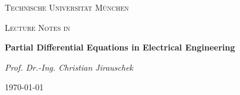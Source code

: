 \documentclass[11pt,a4paper]{report}%
\begin{document}
%
\begin{titlepage}
\centering
{\scshape\LARGE Technische Universit\"at M\"unchen\par}  \vspace{1cm}
{\scshape\Large Lecture Notes in\par}  \vspace{1.5cm}  {\huge\bfseries Partial
Differential Equations in Electrical Engineering \par}  \vspace{2cm}
{\Large\itshape Prof. Dr.-Ing. Christian Jirauschek \par}  \vfill
{\large\today\par}
\end{titlepage}%

\tableofcontents
{}%


\end{document}
